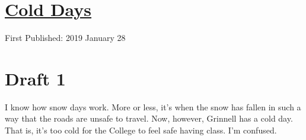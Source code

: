 \documentclass[12pt]{article}[titlepage]
\newcommand{\1}{\={a}}
\newcommand{\2}{\={e}}
\newcommand{\3}{\={\i}}
\newcommand{\4}{\=o}
\newcommand{\5}{\=u}
\newcommand{\6}{\={A}}
\renewcommand{\,}{\textsuperscript{,}}
\begin{document}
\doublespacing
\section{\href{cold-days.html}{Cold Days}}
First Published: 2019 January 28
\section{Draft 1}
I know how snow days work.
More or less, it's when the snow has fallen in such a way that the roads are unsafe to travel.
Now, however, Grinnell has a cold day.
That is, it's too cold for the College to feel safe having class.
I'm confused.
\end{document}
